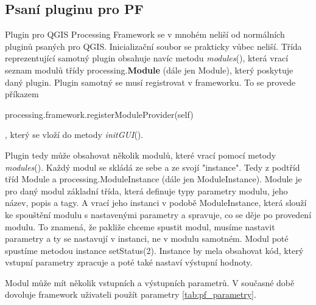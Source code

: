 \subsection{Psaní pluginu pro PF}
Plugin pro QGIS Processing Framework se v mnohém neliší od normálních
pluginů psaných pro QGIS. Inicializační soubor se prakticky vůbec
neliší. Třída reprezentující samotný plugin obsahuje navíc
metodu \textit{modules}(), která vrací seznam modulů třídy
processing.\textbf{Module} (dále jen Module), který poskytuje daný
plugin. Plugin samotný se musí registrovat v frameworku. To se provede
příkazem \begin{scriptsize}processing.framework.registerModuleProvider(self)\end{scriptsize},
který se vloží do metody \textit{initGUI}().

Plugin tedy může obsahovat několik modulů, které vrací pomocí
metody \textit{modules}(). Každý modul se skládá ze sebe a ze svojí
"instance". Tedy z podtříd tříd Module a processing.ModuleInstance
(dále jen ModuleInstance). Module je pro daný modul základní třída,
která definuje typy parametry modulu, jeho název, popis a tagy. A
vrací jeho instanci v podobě ModuleInstance, která slouží ke spouštění
modulu s nastavenými parametry a spravuje, co se děje po provedení
modulu. To znamená, že pakliže chceme spustit modul, musíme nastavit
parametry a ty se nastavují v instanci, ne v modulu samotném. Modul
poté spustíme metodou instance setStatus(2). Instance by mela
obsahovat kód, který vstupní parametry zpracuje a poté také nastaví
výstupní hodnoty.

Modul může mít několik vstupních a výstupních parametrů. V současné
době dovoluje framework uživateli použít
parametry \ref{tab:pf_parametry}.

